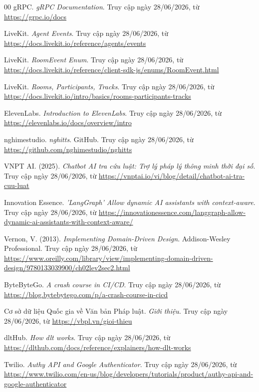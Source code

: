 \begin{thebibliography}{00}
gRPC. \textit{gRPC Documentation}. Truy cập ngày 28/06/2026, từ \url{https://grpc.io/docs}

LiveKit. \textit{Agent Events}. Truy cập ngày 28/06/2026, từ \url{https://docs.livekit.io/reference/agents/events}

LiveKit. \textit{RoomEvent Enum}. Truy cập ngày 28/06/2026, từ \url{https://docs.livekit.io/reference/client-sdk-js/enums/RoomEvent.html}

LiveKit. \textit{Rooms, Participants, Tracks}. Truy cập ngày 28/06/2026, từ \url{https://docs.livekit.io/intro/basics/rooms-participants-tracks}

ElevenLabs. \textit{Introduction to ElevenLabs}. Truy cập ngày 28/06/2026, từ \url{https://elevenlabs.io/docs/overview/intro}

nghimestudio. \textit{nghitts}. GitHub. Truy cập ngày 28/06/2026, từ \url{https://github.com/nghimestudio/nghitts}

VNPT AI. (2025). \textit{Chatbot AI tra cứu luật: Trợ lý pháp lý thông minh thời đại số}. Truy cập ngày 28/06/2026, từ \url{https://vnptai.io/vi/blog/detail/chatbot-ai-tra-cuu-luat}

Innovation Essence. \textit{'LangGraph' Allow dynamic AI assistants with context-aware}. Truy cập ngày 28/06/2026, từ \url{https://innovationessence.com/langgraph-allow-dynamic-ai-assistants-with-context-aware/}

Vernon, V. (2013). \textit{Implementing Domain-Driven Design}. Addison-Wesley Professional. Truy cập ngày 28/06/2026, từ \url{https://www.oreilly.com/library/view/implementing-domain-driven-design/9780133039900/ch02lev2sec2.html}

ByteByteGo. \textit{A crash course in CI/CD}. Truy cập ngày 28/06/2026, từ \url{https://blog.bytebytego.com/p/a-crash-course-in-cicd}

Cơ sở dữ liệu Quốc gia về Văn bản Pháp luật. \textit{Giới thiệu}. Truy cập ngày 28/06/2026, từ \url{https://vbpl.vn/gioi-thieu}

dltHub. \textit{How dlt works}. Truy cập ngày 28/06/2026, từ \url{https://dlthub.com/docs/reference/explainers/how-dlt-works}

Twilio. \textit{Authy API and Google Authenticator}. Truy cập ngày 28/06/2026, từ \url{https://www.twilio.com/en-us/blog/developers/tutorials/product/authy-api-and-google-authenticator}

\end{thebibliography}
\endgroup

\newpage
